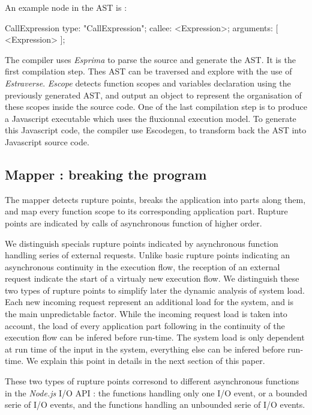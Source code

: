 An example node in the AST is :

\begin{code}[Javascript, caption={Example of an AST node},label={lst:astnode}]
CallExpression {
    type: "CallExpression";
    callee: <Expression>;
    arguments: [ <Expression> ];
}
\end{code}

The compiler uses \textit{Esprima} to parse the source and generate the AST.
It is the first compilation step.
Thes AST can be traversed and explore with the use of \textit{Estraverse}.
\textit{Escope} detects function scopes and variables declaration using the previously generated AST, and output an object to represent the organisation of these scopes inside the source code.
One of the last compilation step is to produce a Javascript executable which uses the fluxionnal execution model.
To generate this Javascript code, the compiler use Escodegen, to transform back the AST into Javascript source code.

\subsection{Mapper : breaking the program}

The mapper detects rupture points, breaks the application into parts along them, and map every function scope to its corresponding application part.
Rupture points are indicated by calls of asynchronous function of higher order.

We distinguish specials rupture points indicated by asynchronous function handling series of external requests.
Unlike basic rupture points indicating an asynchronous continuity in the execution flow, the reception of an external request indicate the start of a virtualy new execution flow.
We distinguish these two types of rupture points to simplify later the dynamic analysis of system load.
Each new incoming request represent an additional load for the system, and is the main unpredictable factor.
While the incoming request load is taken into account, the load of every application part following in the continuity of the execution flow can be infered before run-time. 
The system load is only dependent at run time of the input in the system, everything else can be infered before run-time.
We explain this point in details in the next section of this paper.

These two types of rupture points corresond to different asynchronous functions in the \textit{Node.js} I/O API : the functions handling only one I/O event, or a bounded serie of I/O events, and the functions handling an unbounded serie of I/O events.

